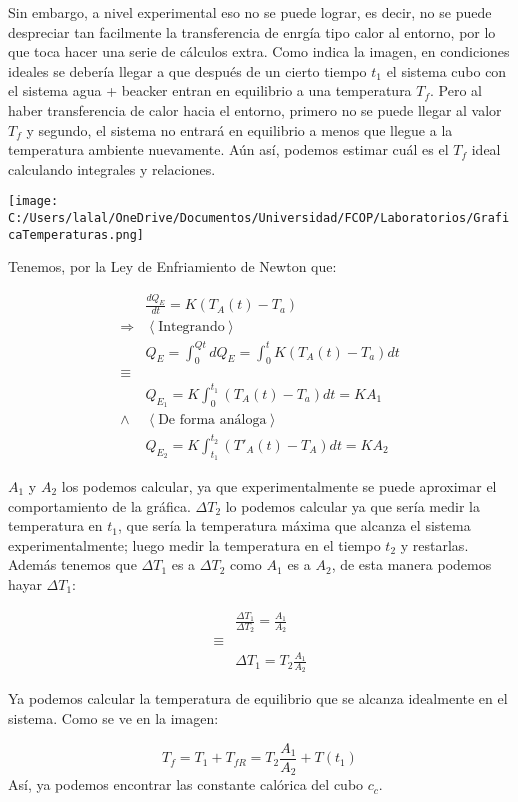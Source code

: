 \documentclass{article}
\begin{document}
Sin embargo, a nivel experimental eso no se puede lograr, es decir,
no se puede despreciar tan facilmente la transferencia de enrgía 
tipo calor al entorno, por lo que toca hacer una serie de cálculos
extra. Como indica la imagen, en condiciones ideales 
se debería llegar a que después de un cierto tiempo $t_1$ el sistema 
cubo con el sistema agua + beacker entran en equilibrio a una temperatura
$T_f$. Pero al haber transferencia de calor hacia el entorno, primero
no se puede llegar al valor $T_f$ y segundo, el sistema no entrará en equilibrio
a menos que llegue a la temperatura ambiente nuevamente. Aún así, podemos 
estimar cuál es el $T_f$ ideal calculando integrales y relaciones.


\texttt{[image: C:/Users/lalal/OneDrive/Documentos/Universidad/FCOP/Laboratorios/GraficaTemperaturas.png]}


Tenemos, por la Ley de Enfriamiento de Newton que:

\begin{align*}
    & \frac{dQ_E}{dt} = K(T_A(t) - T_a)\\
    \Rightarrow& \left<\text{Integrando} \right> \\
    & Q_E = \int_{0}^{Qt} dQ_E = \int_{0}^{t} K(T_A(t) - T_a) dt\\
    \equiv& \\
    & Q_{E_1} = K\int_{0}^{t_1} (T_A(t) - T_a)dt = KA_1\\
    \land& \left< \text{De forma análoga} \right>\\
    & Q_{E_2} = K\int_{t_1}^{t_2} (T'_A (t) - T_A)dt = KA_2
\end{align*}

$A_1$ y $A_2$ los podemos calcular, ya que experimentalmente se puede 
aproximar el comportamiento de la gráfica. $\Delta T_2$ lo podemos calcular
ya que sería medir la temperatura en $t_1$, que sería la temperatura máxima que 
alcanza el sistema experimentalmente; luego medir la temperatura en el tiempo $t_2$ y 
restarlas.
Además tenemos que $\Delta T_1$ es a $\Delta T_2$ como $A_1$ es a $A_2$, de esta manera
podemos hayar $\Delta T_1$:

\begin{align*}
    & \frac{\Delta T_1}{\Delta T_2} = \frac{A_1}{A_2}\\
    \equiv& \\
    & \Delta T_1 = T_2 \frac{A_1}{A_2}
\end{align*}

Ya podemos calcular la temperatura de equilibrio que se alcanza
idealmente en el sistema. Como se ve en la imagen:

\[
    T_f = T_1 + T_{fR} = T_2 \frac{A_1}{A_2} + T(t_1)
\]
Así, ya podemos encontrar las constante calórica del cubo $c_c$.
\end{document}
